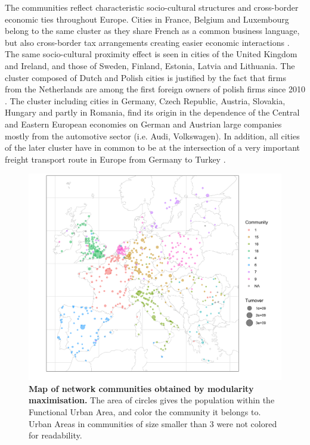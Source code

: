 \documentclass[10pt,letterpaper]{article}
\begin{document}
The communities reflect characteristic socio-cultural structures and cross-border economic ties throughout Europe. Cities in France, Belgium and Luxembourg belong to the same cluster as they share French as a common business language, but also cross-border tax arrangements creating easier economic interactions \cite{DecovilleDurand2019}. The same socio-cultural proximity effect is seen in cities of the United Kingdom and Ireland, and those of Sweden, Finland, Estonia, Latvia and Lithuania. The cluster composed of Dutch and Polish cities is justified by the fact that firms from the Netherlands are among the first foreign owners of polish firms since 2010 \cite{2019arXiv191014652Z}. The cluster including cities in Germany, Czech Republic, Austria, Slovakia, Hungary and partly in Romania, find its origin in the dependence of the Central and Eastern European economies on German and Austrian large companies mostly from the automotive sector (i.e. Audi, Volkswagen). In addition, all cities of the later cluster have in common to be at the intersection of a very important freight transport route in Europe from Germany to Turkey \cite{Zdanowska2017}. 
\begin{figure}
    \begin{center}
    \includegraphics[width=\linewidth]{figures/Fig2.png}
    \end{center}
    \caption{{\bf Map of network communities obtained by modularity maximisation.} The area of circles gives the population within the Functional Urban Area, and color the community it belongs to. Urban Areas in communities of size smaller than 3 were not colored for readability.}
    \label{fig:fig2}
\end{figure}
\end{document}
